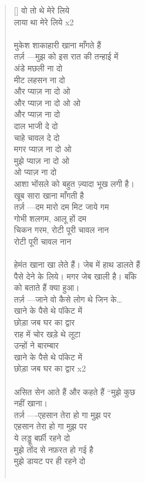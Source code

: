 \begin{verse}[\versewidth]
{वो तो थे मेरे लिये\\
लाया था मेरे लिये x2\\
\\
मुकेश शाकाहारी खाना माँगते हैं\\
तर्ज़ —मुझ को इस रात की तन्हाई में\\
अंडे मछली ना दो\\
मीट लहसन ना दो\\
और प्याज़ ना दो ओ\\
और प्याज़ ना दो ओ ओ\\
और प्याज़ ना दो\\
दाल भाजी दे दो\\
चाहे चावल दे दो\\
मगर प्याज़ ना दो ओ\\
मुझे प्याज़ ना दो ओ\\
ओ प्याज़ ना दो\\
आशा भोंसले को बहुत ज़्यादा भूख लगी है।\\
खूब सारा खाना माँगती है\\
तर्ज़ —दम मारो दम मिट जाये गम\\
गोभी शलगम, आलू हों दम\\
चिकन गरम, रोटी पूरी चावल नान\\
रोटी पूरी चावल नान\\
\\
हेमंत खाना खा लेते हैं। जेब में हाथ डालते हैं\\
पैसे देने के लिये। मगर जेब खाली है। बाँके\\
को बताते हैं क्या हुआ।\\
तर्ज़ —जाने वो कैसे लोग थे जिन के…\\
खाने के पैसे थे पॉकेट में\\
छोड़ा जब घर का द्वार\\
राह में चोर खड़े थे लूटा\\
उन्हों ने बारम्बार\\
खाने के पैसे थे पॉकेट में\\
छोड़ा जब घर का द्वार x2\\
\\
असित सेन आते हैं और कहते हैं “मुझे कुछ\\
नहीं खाना।\\
तर्ज़ —-एहसान तेरा हो गा मुझ पर\\
एहसान तेरा हो गा मुझ पर\\
ये लड्डू बर्फ़ी रहने दो\\
मुझे तोंद से नफ़रत हो गई है\\
मुझे डायट पर ही रहने दो\\
\\
}
\end{verse}
